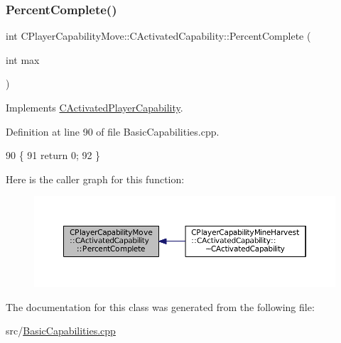 \hypertarget{classCPlayerCapabilityMove_1_1CActivatedCapability_a1696dd16d89d0978284a95dd1531d0d5}{}\label{classCPlayerCapabilityMove_1_1CActivatedCapability_a1696dd16d89d0978284a95dd1531d0d5} 
\subsubsection{\texorpdfstring{Percent\+Complete()}{PercentComplete()}}
{\footnotesize\ttfamily int C\+Player\+Capability\+Move\+::\+C\+Activated\+Capability\+::\+Percent\+Complete (\begin{DoxyParamCaption}\item[{int}]{max }\end{DoxyParamCaption})\hspace{0.3cm}{\ttfamily [virtual]}}



Implements \hyperlink{classCActivatedPlayerCapability_a405dc6076058006a4f801727de4cfe4d}{C\+Activated\+Player\+Capability}.



Definition at line 90 of file Basic\+Capabilities.\+cpp.


\begin{DoxyCode}
90                                                                      \{
91     \textcolor{keywordflow}{return} 0;
92 \}
\end{DoxyCode}
Here is the caller graph for this function\+:\nopagebreak
\begin{figure}[H]
\begin{center}
\leavevmode
\includegraphics[width=350pt]{classCPlayerCapabilityMove_1_1CActivatedCapability_a1696dd16d89d0978284a95dd1531d0d5_icgraph}
\end{center}
\end{figure}


The documentation for this class was generated from the following file\+:\begin{DoxyCompactItemize}
\item 
src/\hyperlink{BasicCapabilities_8cpp}{Basic\+Capabilities.\+cpp}\end{DoxyCompactItemize}
